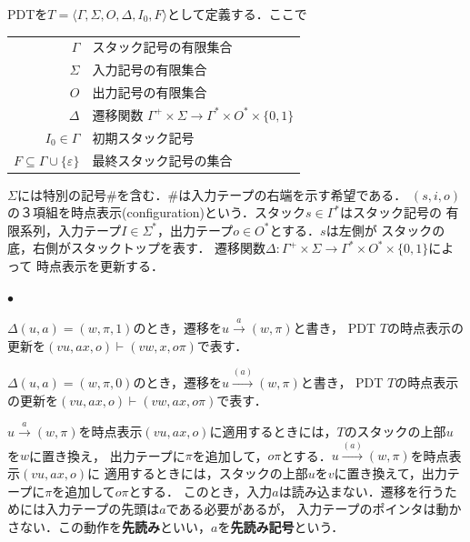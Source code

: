 \documentclass[a4j,dvipdfmx]{jbook}
\begin{document}
\begin{Def}
  PDTを$T=\langle\Gamma,\Sigma,O,\Delta,I_0,F\rangle$として定義する．ここで

  \begin{tabular}{rl}
    $\Gamma$                              & スタック記号の有限集合                                                                 \\
    $\Sigma$                              & 入力記号の有限集合                                                                   \\
    $O$                                   & 出力記号の有限集合                                                                   \\
    $\Delta$                              & 遷移関数 $\Gamma^+\times\Sigma\rightarrow\Gamma^\ast\times O^\ast\times\{0,1\}$ \\
    $I_0\in\Gamma$                        & 初期スタック記号                                                                    \\
    $F\subseteq\Gamma\cup\{\varepsilon\}$ & 最終スタック記号の集合
  \end{tabular}
\end{Def}

$\Sigma$には特別の記号$\texttt{\#}$を含む．$\texttt{\#}$は入力テープの右端を示す希望である．
$(s,i,o)$の３項組を時点表示(configuration)という．スタック$s\in\Gamma^\ast$はスタック記号の
有限系列，入力テープ$I\in\Sigma^\ast$，出力テープ$o\in O^\ast$とする．$s$は左側が
スタックの底，右側がスタックトップを表す．
遷移関数$\Delta:\Gamma^+\times\Sigma\rightarrow\Gamma^\ast\times O^\ast\times\{0,1\}$によって
時点表示を更新する．
\begin{list}{$\bullet$}{}
  \item $\Delta(u,a)=(w,\pi,1)$のとき，遷移を$u\xrightarrow{a}(w,\pi)$と書き，
        PDT $T$の時点表示の更新を$(vu,ax,o)\vdash (vw,x,o\pi)$で表す．
  \item $\Delta(u,a)=(w,\pi,0)$のとき，遷移を$u\xrightarrow{(a)}(w,\pi)$と書き，
        PDT $T$の時点表示の更新を$(vu,ax,o)\vdash (vw,ax,o\pi)$で表す．
\end{list}

$u\xrightarrow{a}(w,\pi)$を時点表示$(vu,ax,o)$に適用するときには，$T$のスタックの上部$u$を$w$に置き換え，
出力テープに$\pi$を追加して，$o\pi$とする．$u\xrightarrow{(a)}(w,\pi)$を時点表示$(vu,ax,o)$に
適用するときには，スタックの上部$u$を$v$に置き換えて，出力テープに$\pi$を追加して$o\pi$とする．
このとき，入力$a$は読み込まない．遷移を行うためには入力テープの先頭は$a$である必要があるが，
入力テープのポインタは動かさない．この動作を{\bf 先読み}といい，$a$を{\bf 先読み記号}という．
\end{document}
